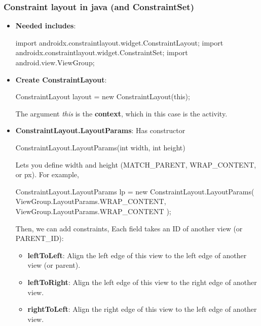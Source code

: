 \documentclass{report}
\begin{document}
    \subsubsection{Constraint layout in java (and ConstraintSet)}
    \begin{itemize}
        \item \textbf{Needed includes}:
            \bigbreak \noindent 
            \begin{javacode}
                import androidx.constraintlayout.widget.ConstraintLayout;
                import androidx.constraintlayout.widget.ConstraintSet;
                import android.view.ViewGroup;
            \end{javacode}
        \item \textbf{Create ConstraintLayout}:
            \bigbreak \noindent 
            \begin{javacode}
                ConstraintLayout layout = new ConstraintLayout(this);
            \end{javacode}
            The argument \textit{this} is the \textbf{context}, which in this case is the activity.
        \item \textbf{ConstraintLayout.LayoutParams}: Has constructor
            \bigbreak \noindent 
            \begin{javacode}
            ConstraintLayout.LayoutParams(int width, int height)
            \end{javacode}
            Lets you define width and height (MATCH\_PARENT, WRAP\_CONTENT, or px).
            \bigbreak \noindent 
            For example,
            \bigbreak \noindent 
            \begin{javacode}
                ConstraintLayout.LayoutParams lp =
                    new ConstraintLayout.LayoutParams(
                    ViewGroup.LayoutParams.WRAP_CONTENT,
                    ViewGroup.LayoutParams.WRAP_CONTENT
                );
            \end{javacode}
            Then, we can add constraints, Each field takes an ID of another view (or PARENT_ID):
            \begin{itemize}
                \item \textbf{leftToLeft}: Align the left edge of this view to the left edge of another view (or parent).
                \item \textbf{leftToRight}: Align the left edge of this view to the right edge of another view.
                \item \textbf{rightToLeft}: Align the right edge of this view to the left edge of another view.

\end{itemize}
\end{itemize}
\end{document}
